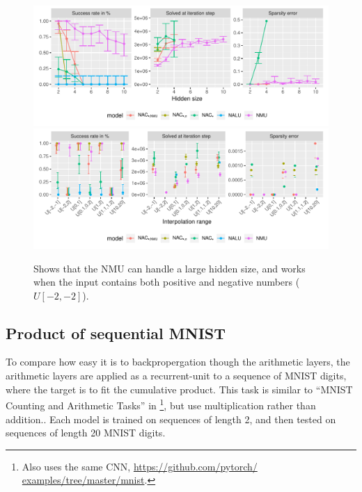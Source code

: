\begin{figure}[h]
\centering
\includegraphics[width=\linewidth,trim={0 1.3cm 0 0},clip]{results/simple_function_static_mul_hidden_size.pdf}
\includegraphics[width=\linewidth,trim={0 0 0 0.809cm},clip]{results/simple_function_static_mul_range.pdf}
\caption{Shows that the NMU can handle a large hidden size, and works when the input contains both positive and negative numbers ($U[-2,-2]$).} 
\label{fig:simple-function-static-theoreical-claims-experiment}
\end{figure}

\subsection{Product of sequential MNIST}

To compare how easy it is to backpropergation though the arithmetic layers, the arithmetic layers are applied as a recurrent-unit to a sequence of MNIST digits, where the target is to fit the cumulative product. This task is similar to ``MNIST Counting and Arithmetic Tasks'' in \cite{trask-nalu}\footnote{Also uses the same CNN, \url{https://github.com/pytorch/
examples/tree/master/mnist}.}, but use multiplication rather than addition.. Each model is trained on sequences of length 2, and then tested on sequences of length 20 MNIST digits.

